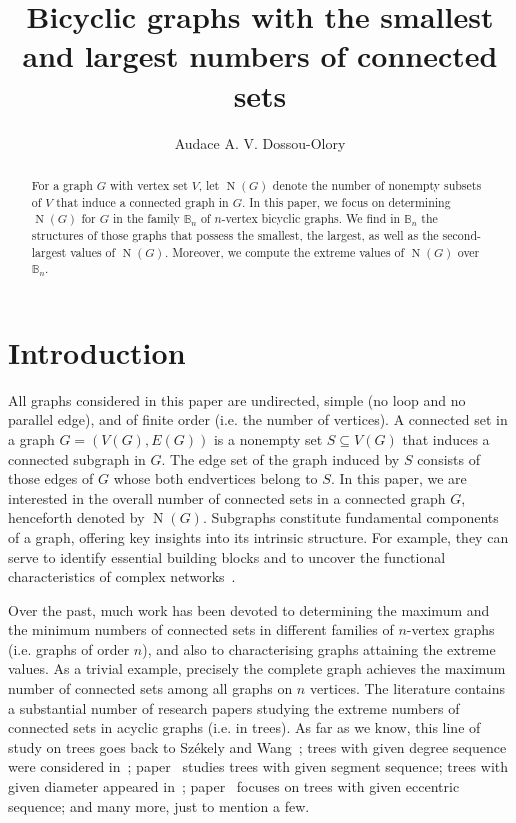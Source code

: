 \documentclass[a4paper,12pt]{amsart}
\title{Bicyclic graphs with the smallest and largest numbers of connected sets}
\author{Audace A. V. Dossou-Olory}
\theoremstyle{remark}
\DeclareMathOperator{\N}{N}
\begin{document}
\begin{abstract}	
For a graph $G$ with vertex set $V$, let $\N(G)$ denote the number of nonempty subsets of $V$ that induce a connected graph in $G$. In this paper, we focus on determining $\N(G)$ for $G$ in the family $\mathbb{B}_n$ of $n$-vertex bicyclic graphs. We find in $\mathbb{B}_n$ the structures of those graphs that possess the smallest, the largest, as well as the second-largest values of $\N(G)$. Moreover, we compute the extreme values of $\N(G)$ over $ \mathbb{B}_n$.
\end{abstract}

\maketitle

\section{Introduction}\label{Intro:main}


All graphs considered in this paper are undirected, simple (no loop and no parallel edge), and of finite order (i.e. the number of vertices). A connected set in a graph $G=(V(G), E(G))$ is a nonempty set $S\subseteq V(G)$ that induces a connected subgraph in $G$. The edge set of the graph induced by $S$ consists of those edges of $G$ whose both endvertices belong to $S$. In this paper, we are interested in the overall number of connected sets in a connected graph $G$, henceforth denoted by $\N(G)$. Subgraphs constitute fundamental components of a graph, offering key insights into its intrinsic structure. For example, they can serve to identify essential building blocks and to uncover the functional characteristics of complex networks~\cite{Milo2002}.


Over the past, much work has been devoted to determining the maximum and the minimum numbers of connected sets in different families of $n$-vertex graphs (i.e. graphs of order $n$), and also to characterising graphs attaining the extreme values. As a trivial example, precisely the complete graph achieves the maximum number of connected sets among all graphs on $n$ vertices. The literature contains a substantial number of research papers studying the extreme numbers of connected sets in acyclic graphs (i.e. in trees). As far as we know, this line of study on trees goes back to Sz\'ekely and Wang~\cite{Wang2005,Wang2005Plus}; trees with given degree sequence were considered in~\cite{AndriantianaV2021,Andriantiana2013,Zhang2015,ZhangZhang2013}; paper~\cite{Andriantiana2017} studies trees with given segment sequence; trees with given diameter appeared in~\cite{ZichongChen}; paper~\cite{AudDank2020} focuses on trees with given eccentric sequence; and many more, just to mention a few.
\end{document}
